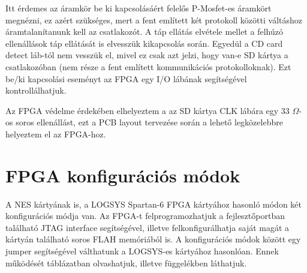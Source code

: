 	Itt érdemes az áramkör be ki kapcsolásáért felelős P-Mosfet-es áramkört megnézni, ez azért szükséges, mert a fent említett két protokoll közötti váltáshoz áramtalanítanunk kell az csatlakozót. A táp ellátás elvétele mellet a felhúzó ellenállások táp ellátását is elvesszük kikapcsolás során. Egyedül a CD card detect láb-tól nem vesszük el, mivel ez csak azt jelzi, hogy van-e SD kártya a csatlakozóban (nem része a fent említett kommunikációs protokolloknak). Ezt be/ki kapcsolási eseményt az FPGA egy I/O lábának segítségével kontrollálhatjuk.
	
	Az FPGA védelme érdekében elhelyeztem a az SD kártya CLK lábára egy 33 $\Omega$-os soros ellenállást, ezt a PCB layout tervezése során a lehető legközelebbre helyeztem el az FPGA-hoz.  
	
\section{FPGA konfigurációs módok}
	
	A NES kártyának is, a LOGSYS Spartan-6 FPGA kártyához hasonló módon \cite{spatan6} két konfigurációs módja van. Az FPGA-t felprogramozhatjuk a fejlesztőportban található JTAG interface segítségével, illetve felkonfigurálhatja saját magát a kártyán található soros FLAH memóriából is. A konfigurációs módok között egy jumper segítségével válthatunk a LOGSYS-es kártyához hasonlóan. Ennek működését  táblázatban olvashatjuk, illetve  függelékben láthatjuk.       
	
